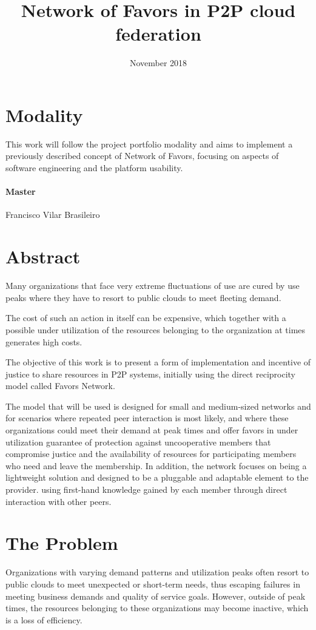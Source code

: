 \documentclass{article}
\title{Network of Favors in P2P cloud federation}
\author{Gustavo Diniz Monteiro \\ \href{gustavo.monteiro@ccc.ufcg.edu.br, gustavo.d.monteiro@icloud.com} }
\date{November 2018}
\begin{document}
\maketitle

\section{Modality}

This work will follow the project portfolio modality and aims to implement a previously described concept of Network of Favors\cite{nof}, focusing on aspects of software engineering and the platform usability.

\paragraph{Master} Francisco Vilar Brasileiro

\section{Abstract}
Many organizations that face very extreme fluctuations of use are cured by use peaks where they have to resort to public clouds to meet fleeting demand.

The cost of such an action in itself can be expensive, which together with a possible under utilization of the resources belonging to the organization at times generates high costs.

The objective of this work is to present a form of implementation and incentive of justice to share resources in P2P systems, initially using the direct reciprocity model called Favors Network.

The model that will be used is designed for small and medium-sized networks and for scenarios where repeated peer interaction is most likely, and where these organizations could meet their demand at peak times and offer favors in under utilization guarantee of protection against uncooperative members that compromise justice and the availability of resources for participating members who need and leave the membership. In addition, the network focuses on being a lightweight solution and designed to be a pluggable and adaptable element to the provider. using first-hand knowledge gained by each member through direct interaction with other peers.

\section{The Problem}
Organizations with varying demand patterns and utilization peaks often resort to public clouds to meet unexpected or short-term needs, thus escaping failures in meeting business demands and quality of service goals.
However, outside of peak times, the resources belonging to these organizations may become inactive, which is a loss of efficiency.
\end{document}

